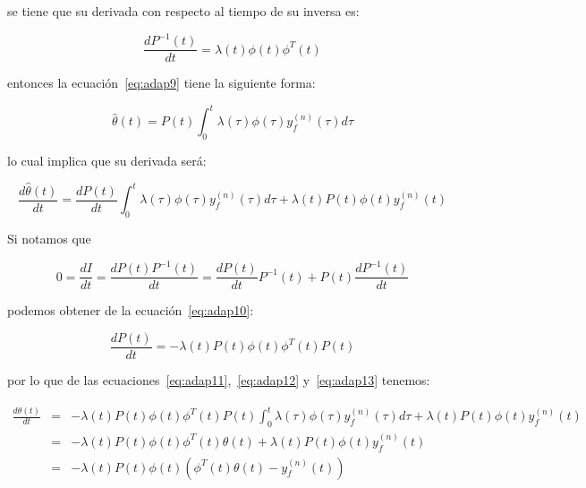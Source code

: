             se tiene que su derivada con respecto al tiempo de su inversa es:

            \begin{equation} \label{eq:adap10}
                \frac{d P^{-1}(t)}{dt} = \lambda(t) \phi(t) \phi^T(t)
            \end{equation}

            entonces la ecuación~\ref{eq:adap9} tiene la siguiente forma:

            \begin{equation} \label{eq:adap11}
                \hat{\theta}(t) = P(t) \int_0^t \lambda(\tau) \phi(\tau) y_f^{(n)}(\tau) d\tau
            \end{equation}

            lo cual implica que su derivada será:

            \begin{equation} \label{eq:adap12}
                \frac{d \hat{\theta}(t)}{dt} = \frac{d P(t)}{dt} \int_0^t \lambda(\tau) \phi(\tau) y_f^{(n)}(\tau) d\tau + \lambda(t) P(t) \phi(t) y_f^{(n)}(t)
            \end{equation}

            Si notamos que

            \begin{equation*}
                0 = \frac{dI}{dt} = \frac{dP(t) P^{-1}(t)}{dt} = \frac{dP(t)}{dt} P^{-1}(t) + P(t) \frac{dP^{-1}(t)}{dt}
            \end{equation*}

            podemos obtener de la ecuación~\ref{eq:adap10}:

            \begin{equation} \label{eq:adap13}
                \frac{d P(t)}{dt} = - \lambda(t) P(t) \phi(t) \phi^T(t) P(t)
            \end{equation}

            por lo que de las ecuaciones~\ref{eq:adap11},~\ref{eq:adap12} y~\ref{eq:adap13} tenemos:

            \begin{eqnarray*}
                \frac{d \hat{\theta}(t)}{dt} & = & - \lambda(t) P(t) \phi(t) \phi^T(t) P(t) \int_0^t \lambda(\tau) \phi(\tau) y_f^{(n)}(\tau) d\tau + \lambda(t) P(t) \phi(t) y_f^{(n)}(t) \\
                & = & - \lambda(t) P(t) \phi(t) \phi^T(t) \theta(t) + \lambda(t) P(t) \phi(t) y_f^{(n)}(t) \\
                & = & - \lambda(t) P(t) \phi(t) \left( \phi^T(t) \theta(t) - y_f^{(n)}(t) \right)
            \end{eqnarray*}

